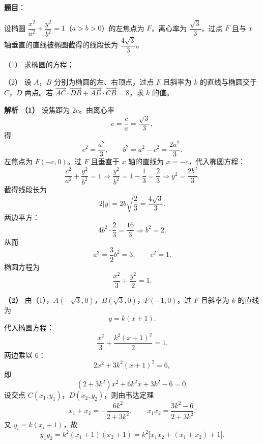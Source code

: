 \begin{answer}

\textbf{题目}：

设椭圆 $\dfrac{x^2}{a^2}+\dfrac{y^2}{b^2}=1$（$a>b>0$）的左焦点为 $F$，离心率为 $\dfrac{\sqrt3}{3}$，过点 $F$ 且与 $x$ 轴垂直的直线被椭圆截得的线段长为 $\dfrac{4\sqrt3}{3}$。

（1） 求椭圆的方程；

（2） 设 $A$，$B$ 分别为椭圆的左、右顶点，过点 $F$ 且斜率为 $k$ 的直线与椭圆交于 $C$，$D$ 两点。若 $\overrightarrow{AC}\cdot\overrightarrow{DB}+\overrightarrow{AD}\cdot\overrightarrow{CB}=8$，求 $k$ 的值。

\textbf{解析}
\textbf{（1）} 设焦距为 $2c$。由离心率
\nopagebreak[4]
\[e=\frac ca=\frac{\sqrt3}{3},\]
得
\nopagebreak[4]
\[c^2=\frac{a^2}{3},\qquad b^2=a^2-c^2=\frac{2a^2}{3}.\]
左焦点为 $F(-c,0)$。过 $F$ 且垂直于 $x$ 轴的直线为 $x=-c$，代入椭圆方程：
\nopagebreak[4]
\[\frac{c^2}{a^2}+\frac{y^2}{b^2}=1
\Longrightarrow \frac{y^2}{b^2}=1-\frac13=\frac23
\Longrightarrow y^2=\frac{2b^2}{3}.\]
截得线段长为
\nopagebreak[4]
\[2|y|=2b\sqrt{\frac23}=\frac{4\sqrt3}{3}.\]
两边平方：
\nopagebreak[4]
\[4b^2\cdot\frac23=\frac{16}{3}\Longrightarrow b^2=2.\]
从而
\nopagebreak[4]
\[a^2=\frac32b^2=3,\qquad c^2=1.\]
椭圆方程为
\nopagebreak[4]
\[\frac{x^2}{3}+\frac{y^2}{2}=1.\]

\textbf{（2）} 由（1），$A(-\sqrt3,0)$，$B(\sqrt3,0)$，$F(-1,0)$。过 $F$ 且斜率为 $k$ 的直线为
\nopagebreak[4]
\[y=k(x+1).\]
代入椭圆方程：
\nopagebreak[4]
\[\frac{x^2}{3}+\frac{k^2(x+1)^2}{2}=1.\]
两边乘以 $6$：
\nopagebreak[4]
\[2x^2+3k^2(x+1)^2=6,\]
即
\nopagebreak[4]
\[(2+3k^2)x^2+6k^2x+3k^2-6=0.\]
设交点 $C(x_1,y_1)$，$D(x_2,y_2)$，则由韦达定理
\nopagebreak[4]
\[x_1+x_2=-\frac{6k^2}{2+3k^2},\qquad
x_1x_2=\frac{3k^2-6}{2+3k^2}.\]
又 $y_i=k(x_i+1)$，故
\nopagebreak[4]
\[y_1y_2=k^2(x_1+1)(x_2+1)
=k^2\bigl[x_1x_2+(x_1+x_2)+1\bigr].\]


\end{answer}

